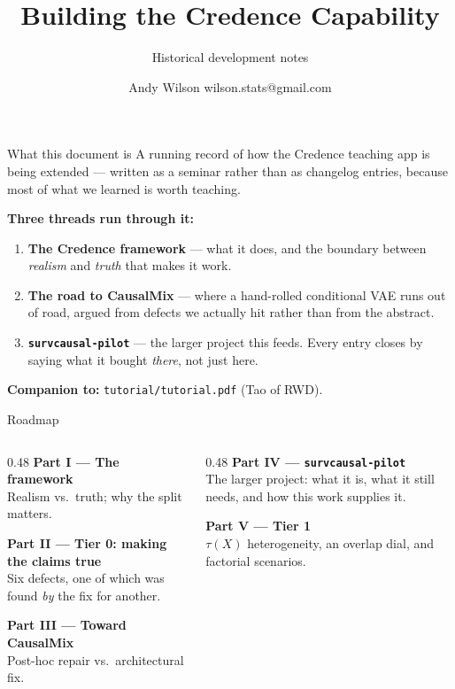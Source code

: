 \documentclass[aspectratio=169]{beamer}
\title[Credence dev log]{Building the Credence Capability}
\subtitle{Historical development notes}
\author{Andy Wilson \enskip\textbar\enskip wilson.stats@gmail.com}
\institute{Tao of RWD \enskip\textbar\enskip tao-rwd.com}
\date{}
\begin{document}
\begin{frame}[plain]
  \titlepage
\end{frame}

\begin{frame}{What this document is}
  \small
  A running record of how the Credence teaching app is being extended --- written
  as a seminar rather than as changelog entries, because most of what we learned is
  worth teaching.

  \vspace{0.6em}
  \textbf{Three threads run through it:}
  \begin{enumerate}
    \item \textbf{The Credence framework} --- what it does, and the boundary between
          \emph{realism} and \emph{truth} that makes it work.
    \item \textbf{The road to CausalMix} --- where a hand-rolled conditional VAE runs
          out of road, argued from defects we actually hit rather than from the abstract.
    \item \textbf{\texttt{survcausal-pilot}} --- the larger project this feeds. Every
          entry closes by saying what it bought \emph{there}, not just here.
  \end{enumerate}

  \vspace{0.6em}
  \textcolor{accent}{\textbf{Companion to:}} \texttt{tutorial/tutorial.pdf}
  (Tao of RWD).
\end{frame}

\begin{frame}{Roadmap}
  \small
  \begin{columns}[T,totalwidth=\textwidth]
    \begin{column}{0.48\textwidth}
      \textbf{Part I --- The framework}\\
      Realism vs.\ truth; why the split matters.
      \vspace{0.5em}

      \textbf{Part II --- Tier 0: making the claims true}\\
      Six defects, one of which was found \emph{by} the fix for another.
      \vspace{0.5em}

      \textbf{Part III --- Toward CausalMix}\\
      Post-hoc repair vs.\ architectural fix.
    \end{column}
    \begin{column}{0.48\textwidth}
      \textbf{Part IV --- \texttt{survcausal-pilot}}\\
      The larger project: what it is, what it still needs, and how this work
      supplies it.
      \vspace{0.5em}

      \textbf{Part V --- Tier 1}\\
      $\tau(X)$ heterogeneity, an overlap dial, and factorial scenarios.
    \end{column}
  \end{columns}
\end{frame}
\end{document}
